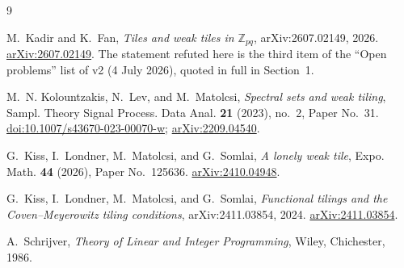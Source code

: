 \documentclass[11pt]{amsart}
\theoremstyle{definition}
\theoremstyle{remark}
\begin{document}
\begin{thebibliography}{9}

M.~Kadir and K.~Fan,
\emph{Tiles and weak tiles in $\mathbb Z_{pq}$},
arXiv:2607.02149, 2026.
\href{https://arxiv.org/abs/2607.02149}{arXiv:2607.02149}.
The statement refuted here is the third item of the ``Open problems'' list of
v2 (4 July 2026), quoted in full in Section~1.

M.~N. Kolountzakis, N.~Lev, and M.~Matolcsi,
\emph{Spectral sets and weak tiling},
Sampl. Theory Signal Process. Data Anal. \textbf{21} (2023), no.~2, Paper
No.~31.
\href{https://doi.org/10.1007/s43670-023-00070-w}{doi:10.1007/s43670-023-00070-w};
\href{https://arxiv.org/abs/2209.04540}{arXiv:2209.04540}.

G.~Kiss, I.~Londner, M.~Matolcsi, and G.~Somlai,
\emph{A lonely weak tile},
Expo. Math. \textbf{44} (2026), Paper No.~125636.
\href{https://arxiv.org/abs/2410.04948}{arXiv:2410.04948}.

G.~Kiss, I.~Londner, M.~Matolcsi, and G.~Somlai,
\emph{Functional tilings and the Coven--Meyerowitz tiling conditions},
arXiv:2411.03854, 2024.
\href{https://arxiv.org/abs/2411.03854}{arXiv:2411.03854}.

A.~Schrijver,
\emph{Theory of Linear and Integer Programming},
Wiley, Chichester, 1986.

\end{thebibliography}
\end{document}

